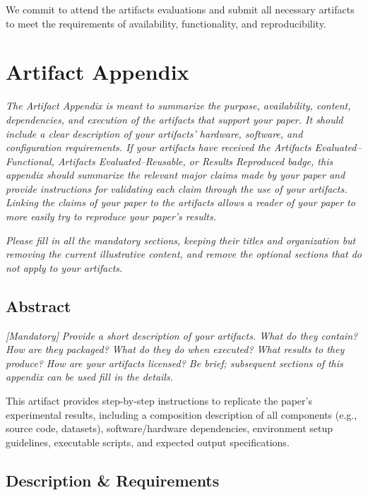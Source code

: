 \documentclass[sigconf]{acmart}
\begin{document}
We commit to attend the artifacts evaluations and submit all necessary artifacts to meet the requirements of availability, functionality, and reproducibility.

\newpage

\section{Artifact Appendix}

\emph{The Artifact Appendix is meant to summarize the purpose,
availability, content, dependencies, and execution of the artifacts
that support your paper.  It should include a clear description of
your artifacts' hardware, software, and configuration requirements.
If your artifacts have received the \emph{Artifacts
Evaluated--Functional}, \emph{Artifacts Evaluated--Reusable}, or
\emph{Results Reproduced} badge, this appendix should summarize the
relevant major claims made by your paper and provide instructions for
validating each claim through the use of your artifacts.  Linking the
claims of your paper to the artifacts allows a reader of your paper
to more easily try to reproduce your paper's results.}

\emph{Please fill in all the mandatory sections, keeping their titles
and organization but removing the current illustrative content, and
remove the optional sections that do not apply to your artifacts.}


\subsection{Abstract}

\emph{[Mandatory]}
%
\emph{Provide a short description of your artifacts.  What do they
contain?  How are they packaged?  What do they do when executed?  What
results to they produce?  How are your artifacts licensed?  Be brief;
subsequent sections of this appendix can be used fill in the details.}

This artifact provides step-by-step instructions to replicate the paper’s experimental results, including a composition description of all components (e.g., source code, datasets), software/hardware dependencies, environment setup guidelines, executable scripts, and expected output specifications.

\subsection{Description \& Requirements}
\end{document}
